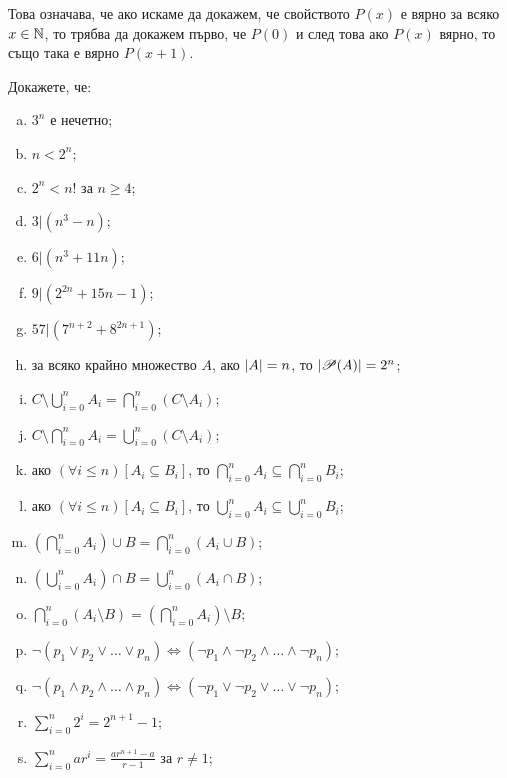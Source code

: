 Това означава, че ако искаме да докажем, че свойството $P(x)$ е вярно за всяко $x\in\mathbb{N}$,
то трябва да докажем първо, че $P(0)$ и след това ако $P(x)$ вярно, то също така е вярно $P(x+1)$.

\begin{problem}
  Докажете, че:
  \begin{enumerate}[a)]
  \item
    $3^n$ е нечетно;
  \item
    $n < 2^n$;
  \item
    $2^n < n!$ за $n \geq 4$;
  \item
    $3 \vert (n^3 - n)$;
  \item
    $6 \vert (n^3 + 11n)$;
  \item
    $9 \vert (2^{2n} + 15n - 1)$;
  \item
    $57 \vert (7^{n+2} + 8^{2n+1})$;
  \item
    за всяко крайно множество $A$,
    ако $\lvert{A}\rvert = n$, то $\lvert{\mathscr{P}(A)}\rvert = 2^n$;
  \item
    $C\setminus \bigcup^n_{i=0}A_i = \bigcap^n_{i=0}(C\setminus A_i)$;
  \item
    $C\setminus \bigcap^n_{i=0}A_i = \bigcup^n_{i=0}(C\setminus A_i)$;
  \item
    ако $(\forall i \leq n)[A_i \subseteq B_i]$, то
    $\bigcap^n_{i=0}A_i \subseteq \bigcap^n_{i=0}B_i$;
  \item
    ако $(\forall i \leq n)[A_i \subseteq B_i]$, то
    $\bigcup^n_{i=0}A_i \subseteq \bigcup^n_{i=0}B_i$;
  \item
    $(\bigcap^n_{i=0} A_i)\cup B = \bigcap^n_{i=0} (A_i\cup B)$;
  \item
    $(\bigcup^n_{i=0} A_i)\cap B = \bigcup^n_{i=0} (A_i\cap B)$;
  \item
    $\bigcap^n_{i=0} (A_i\setminus B) = (\bigcap^n_{i=0} A_i) \setminus B$;
  \item
    $\neg (p_1\vee p_2\vee\dots\vee p_n) \iff (\neg p_1 \wedge \neg p_2 \wedge\dots\wedge \neg p_n)$;
  \item
    $\neg (p_1\wedge p_2\wedge\dots\wedge p_n) \iff (\neg p_1 \vee \neg p_2 \vee \dots \vee \neg p_n)$;
  \item
    $\sum^n_{i=0} 2^i = 2^{n+1} - 1$;
  \item
    $\sum^n_{i=0} ar^i = \frac{ar^{n+1}-a}{r-1}$ за $r \neq 1$;

\end{enumerate}
\end{problem}

